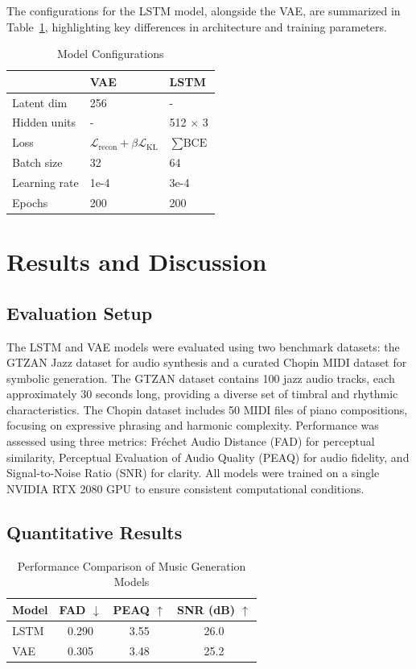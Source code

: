 \documentclass[conference]{IEEEtran}
\begin{document}
The configurations for the LSTM model, alongside the VAE, are summarized in Table~\ref{tab:config}, highlighting key differences in architecture and training parameters.
\begin{table}[h]
\caption{Model Configurations}
\label{tab:config}
\centering
\begin{tabular}{l|ll}
& VAE & LSTM \\
\hline
Latent dim & 256 & - \\
Hidden units & - & 512 $\times$ 3 \\
Loss & $\mathcal{L}_{\text{recon}} + \beta \mathcal{L}_{\text{KL}}$ & $\sum \text{BCE}$ \\
Batch size & 32 & 64 \\
Learning rate & 1e-4 & 3e-4 \\
Epochs & 200 & 200 \\
\end{tabular}
\end{table}

\section{Results and Discussion}
\label{sec:results}

\subsection{Evaluation Setup}
The LSTM and VAE models were evaluated using two benchmark datasets: the GTZAN Jazz dataset for audio synthesis and a curated Chopin MIDI dataset for symbolic generation. The GTZAN dataset contains 100 jazz audio tracks, each approximately 30 seconds long, providing a diverse set of timbral and rhythmic characteristics. The Chopin dataset includes 50 MIDI files of piano compositions, focusing on expressive phrasing and harmonic complexity. Performance was assessed using three metrics: Fréchet Audio Distance (FAD) for perceptual similarity, Perceptual Evaluation of Audio Quality (PEAQ) for audio fidelity, and Signal-to-Noise Ratio (SNR) for clarity. All models were trained on a single NVIDIA RTX 2080 GPU to ensure consistent computational conditions.

\subsection{Quantitative Results}
\begin{table}[H]
    \centering
    \caption{Performance Comparison of Music Generation Models}
    \label{tab:evaluation-metrics}
    \begin{tabular}{|l|c|c|c|}
        \hline
        \textbf{Model} & \textbf{FAD $\downarrow$} & \textbf{PEAQ $\uparrow$} & \textbf{SNR (dB) $\uparrow$} \\
        \hline
        LSTM & 0.290 & 3.55 & 26.0 \\
        VAE  & 0.305 & 3.48 & 25.2 \\
        \hline
    \end{tabular}
\end{table}
\end{document}
